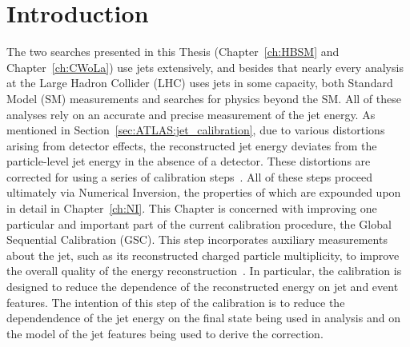 \section{Introduction}
\label{sec:GenNI:intro}
The two searches presented in this Thesis (Chapter~\ref{ch:HBSM} and Chapter~\ref{ch:CWoLa}) use jets extensively, and besides that nearly every analysis at the Large Hadron Collider (LHC) uses jets in some capacity, both Standard Model (SM) measurements and searches for physics beyond the SM.
All of these analyses rely on an accurate and precise measurement of the jet energy.
As mentioned in Section~\ref{sec:ATLAS:jet_calibration}, due to various distortions arising from detector effects, the reconstructed jet energy deviates from the particle-level jet energy in the absence of a detector.
These distortions are corrected for using a series of calibration steps~\cite{PERF-2016-04,Aad:2011he}.
All of these steps proceed ultimately via Numerical Inversion, the properties of which are expounded upon in detail in Chapter~\ref{ch:NI}.
This Chapter is concerned with improving one particular and important part of the current calibration procedure, the Global Sequential Calibration (GSC).
This step incorporates auxiliary measurements about the jet, such as its reconstructed charged particle multiplicity, to improve the overall quality of the energy reconstruction~\cite{ATLAS-CONF-2015-002}.
In particular, the calibration is designed to reduce the dependence of the reconstructed energy on jet and event features.
The intention of this step of the calibration is to reduce the dependendence of the jet energy on the final state being used in analysis and on the model of the jet features being used to derive the correction.

